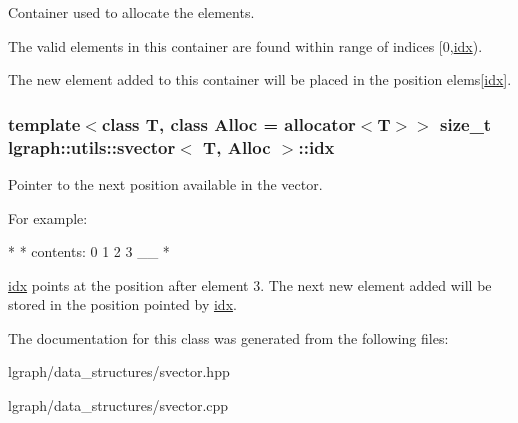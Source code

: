 Container used to allocate the elements. 

The valid elements in this container are found within range of indices \mbox{[}0,\hyperlink{classlgraph_1_1utils_1_1svector_a7ef963c079c7dc8a6a559ceef81a241f}{idx}).

The new element added to this container will be placed in the position elems\mbox{[}\hyperlink{classlgraph_1_1utils_1_1svector_a7ef963c079c7dc8a6a559ceef81a241f}{idx}\mbox{]}. 
\subsubsection[{\texorpdfstring{idx}{idx}}]{\setlength{\rightskip}{0pt plus 5cm}template$<$class T, class Alloc = allocator$<$\+T$>$$>$ size\+\_\+t {\bf lgraph\+::utils\+::svector}$<$ T, Alloc $>$\+::idx\hspace{0.3cm}{\ttfamily [private]}}\hypertarget{classlgraph_1_1utils_1_1svector_a7ef963c079c7dc8a6a559ceef81a241f}{}\label{classlgraph_1_1utils_1_1svector_a7ef963c079c7dc8a6a559ceef81a241f}


Pointer to the next position available in the vector. 

For example\+: \begin{DoxyVerb}*                   \/
* contents: 0 1 2 3 __
* \end{DoxyVerb}
 \hyperlink{classlgraph_1_1utils_1_1svector_a7ef963c079c7dc8a6a559ceef81a241f}{idx} points at the position after element 3. The next new element added will be stored in the position pointed by \hyperlink{classlgraph_1_1utils_1_1svector_a7ef963c079c7dc8a6a559ceef81a241f}{idx}. 

The documentation for this class was generated from the following files\+:\begin{DoxyCompactItemize}
\item 
lgraph/data\+\_\+structures/svector.\+hpp\item 
lgraph/data\+\_\+structures/svector.\+cpp\end{DoxyCompactItemize}
